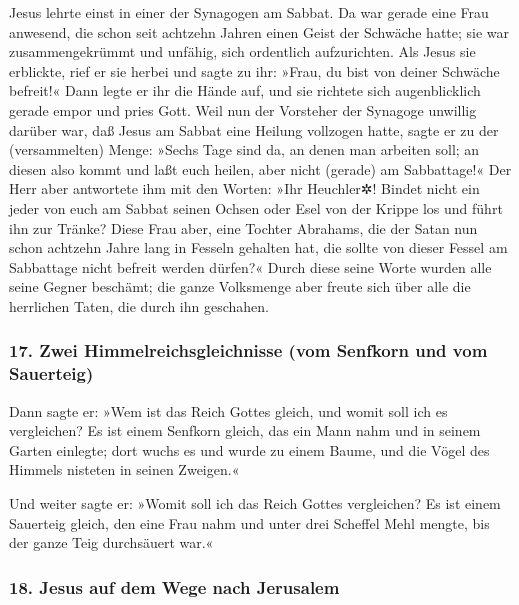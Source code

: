  Jesus lehrte einst in einer der Synagogen am Sabbat.
 Da war gerade eine Frau anwesend, die schon seit
achtzehn Jahren einen Geist der Schwäche hatte; sie war zusammengekrümmt
und unfähig, sich ordentlich aufzurichten.  Als Jesus sie
erblickte, rief er sie herbei und sagte zu ihr: »Frau, du bist von
deiner Schwäche befreit!«  Dann legte er ihr die Hände
auf, und sie richtete sich augenblicklich gerade empor und pries Gott.
 Weil nun der Vorsteher der Synagoge unwillig darüber
war, daß Jesus am Sabbat eine Heilung vollzogen hatte, sagte er zu der
(versammelten) Menge: »Sechs Tage sind da, an denen man arbeiten soll;
an diesen also kommt und laßt euch heilen, aber nicht (gerade) am
Sabbattage!«  Der Herr aber antwortete ihm mit den
Worten: »Ihr Heuchler✲! Bindet nicht ein jeder von euch am Sabbat seinen
Ochsen oder Esel von der Krippe los und führt ihn zur Tränke?
 Diese Frau aber, eine Tochter Abrahams, die der Satan
nun schon achtzehn Jahre lang in Fesseln gehalten hat, die sollte von
dieser Fessel am Sabbattage nicht befreit werden dürfen?«
 Durch diese seine Worte wurden alle seine Gegner
beschämt; die ganze Volksmenge aber freute sich über alle die herrlichen
Taten, die durch ihn geschahen.

\hypertarget{zwei-himmelreichsgleichnisse-vom-senfkorn-und-vom-sauerteig}{%
\subsubsection{17. Zwei Himmelreichsgleichnisse (vom Senfkorn und vom
Sauerteig)}\label{zwei-himmelreichsgleichnisse-vom-senfkorn-und-vom-sauerteig}}

 Dann sagte er: »Wem ist das Reich Gottes gleich, und
womit soll ich es vergleichen?  Es ist einem Senfkorn
gleich, das ein Mann nahm und in seinem Garten einlegte; dort wuchs es
und wurde zu einem Baume, und die Vögel des Himmels nisteten in seinen
Zweigen.«

 Und weiter sagte er: »Womit soll ich das Reich Gottes
vergleichen?  Es ist einem Sauerteig gleich, den eine
Frau nahm und unter drei Scheffel Mehl mengte, bis der ganze Teig
durchsäuert war.«

\hypertarget{jesus-auf-dem-wege-nach-jerusalem}{%
\subsubsection{18. Jesus auf dem Wege nach
Jerusalem}\label{jesus-auf-dem-wege-nach-jerusalem}}

